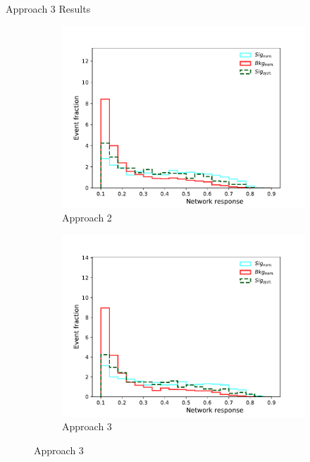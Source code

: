 \begin{frame}{Approach 3 Results}
\vspace{-0.3cm}
    \begin{figure}[htbp]
    \centering
    \begin{subfigure}[b]{0.47\textwidth}
        \includegraphics[width=\textwidth]{app2/app2_syst.pdf}
        \caption{Approach 2}
        \label{fig:simple:final:sepa}
    \end{subfigure}
\quad
    \begin{subfigure}[b]{0.47\textwidth}
        \includegraphics[width=\textwidth]{app3/app3_syst.pdf}
        \caption{Approach 3}
        \label{fig:simple:final:syst}
    \end{subfigure}

\end{figure}
\end{frame}
